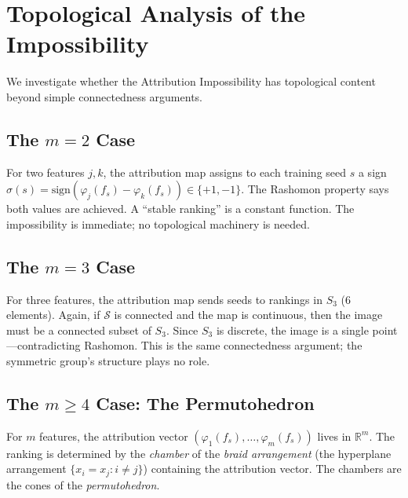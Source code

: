 \documentclass{article}
\newcommand{\R}{\mathbb{R}}
\begin{document}
\section{Topological Analysis of the Impossibility}
\label{sec:topological}

We investigate whether the Attribution Impossibility has topological content beyond simple connectedness arguments.

\subsection{The $m = 2$ Case}

For two features $j, k$, the attribution map assigns to each training seed $s$ a sign $\sigma(s) = \text{sign}(\varphi_j(f_s) - \varphi_k(f_s)) \in \{+1, -1\}$. The Rashomon property says both values are achieved. A ``stable ranking'' is a constant function. The impossibility is immediate; no topological machinery is needed.

\subsection{The $m = 3$ Case}

For three features, the attribution map sends seeds to rankings in $S_3$ (6 elements). Again, if $\mathcal{S}$ is connected and the map is continuous, then the image must be a connected subset of $S_3$. Since $S_3$ is discrete, the image is a single point---contradicting Rashomon. This is the same connectedness argument; the symmetric group's structure plays no role.

\subsection{The $m \geq 4$ Case: The Permutohedron}

For $m$ features, the attribution vector $(\varphi_1(f_s), \ldots, \varphi_m(f_s))$ lives in $\R^m$. The ranking is determined by the \emph{chamber} of the \emph{braid arrangement} (the hyperplane arrangement $\{x_i = x_j : i \neq j\}$) containing the attribution vector. The chambers are the cones of the \emph{permutohedron}.
\end{document}
